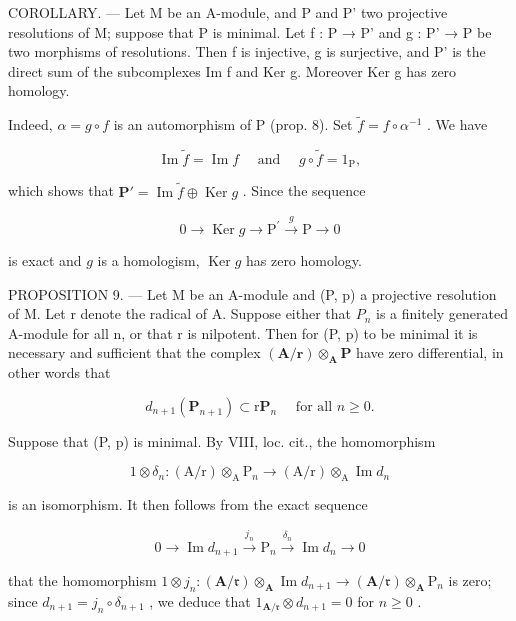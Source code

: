 COROLLARY. --- Let M be an A-module, and P and P' two projective resolutions of M; suppose that P is minimal. Let f : P → P' and g : P' → P be two morphisms of resolutions. Then f is injective, g is surjective, and P' is the direct sum of the subcomplexes Im f and Ker g. Moreover Ker g has zero homology.

Indeed, \(\alpha = g \circ f\) is an automorphism of P (prop. 8). Set \(\tilde{f} = f \circ \alpha^{-1}\) . We have

\[
\operatorname{Im} \tilde {f} = \operatorname{Im} f \quad \text { and } \quad g \circ \tilde {f} = 1 _ {\mathrm{P}},
\]

which shows that \(\mathbf{P}' = \operatorname{Im} \tilde{f} \oplus \operatorname{Ker} g\) . Since the sequence

\[
0 \rightarrow \operatorname{Ker} g \rightarrow \mathrm{P} ^ {\prime} \stackrel {g} {\rightarrow} \mathrm{P} \rightarrow 0
\]

is exact and \(g\) is a homologism, \(\operatorname{Ker} g\) has zero homology.

PROPOSITION 9. --- Let M be an A-module and (P, p) a projective resolution of M. Let r denote the radical of A. Suppose either that \(P_{n}\) is a finitely generated A-module for all n, or that r is nilpotent. Then for (P, p) to be minimal it is necessary and sufficient that the complex \((\mathbf{A}/\mathbf{r}) \otimes_{\mathbf{A}} \mathbf{P}\) have zero differential, in other words that

\[
d _ {n + 1} (\mathbf {P} _ {n + 1}) \subset \mathrm{r} \mathbf {P} _ {n} \quad \text { for all } n \geqslant 0.
\]

Suppose that (P, p) is minimal. By VIII, loc. cit., the homomorphism

\[
1 \otimes \delta_ {n}: (\mathrm{A} / \mathrm{r}) \otimes_ {\mathrm{A}} \mathrm{P} _ {n} \rightarrow (\mathrm{A} / \mathrm{r}) \otimes_ {\mathrm{A}} \operatorname{Im} d _ {n}
\]

is an isomorphism. It then follows from the exact sequence

\[
0 \longrightarrow \operatorname{Im} d _ {n + 1} \xrightarrow {j _ {n}} \mathrm{P} _ {n} \xrightarrow {\delta_ {n}} \operatorname{Im} d _ {n} \longrightarrow 0
\]

that the homomorphism \(1 \otimes j_n : (\mathbf{A} / \mathfrak{r}) \otimes_{\mathbf{A}} \operatorname{Im} d_{n+1} \to (\mathbf{A} / \mathfrak{r}) \otimes_{\mathbf{A}} \mathrm{P}_n\) is zero; since \(d_{n+1} = j_n \circ \delta_{n+1}\) , we deduce that \(1_{\mathbf{A} / \mathfrak{r}} \otimes d_{n+1} = 0\) for \(n \geqslant 0\) .

